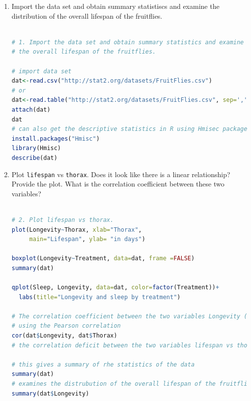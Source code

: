 \documentclass[12pt,letterpaper]{article}
\begin{document}
\begin{enumerate}
	
	\item
	Import the data set and obtain summary statistiscs and examine the distribution of the overall lifespan of the fruitflies.  
	
					\begin{lstlisting}[language=R]

# 1. Import the data set and obtain summary statistics and examine the distrubtion of
# the overall lifespan of the fruitflies.

# import data set
dat<-read.csv("http://stat2.org/datasets/FruitFlies.csv")
# or 
dat<-read.table("http://stat2.org/datasets/FruitFlies.csv", sep=',', header=TRUE)
attach(dat)
dat
# can also get the descriptive statistics in R using Hmisec package
install.packages("Hmisc")
library(Hmisc)
describe(dat)

\end{lstlisting}

\newpage
	\item
	Plot \texttt{lifespan} vs \texttt{thorax}. Does it look like there is a linear relationship? Provide the plot. What is the correlation coefficient between these two variables?
	
						\begin{lstlisting}[language=R]

# 2. Plot lifespan vs thorax. 
plot(Longevity~Thorax, xlab="Thorax",
     main="Lifespan", ylab= "in days")

boxplot(Longevity~Treatment, data=dat, frame =FALSE)
summary(dat)

qplot(Sleep, Longevity, data=dat, color=factor(Treatment))+
  labs(title="Longevity and sleep by treatment")

# The correlation coefficient between the two variables Longevity (or lifespan) and thorax
# using the Pearson correlation
cor(dat$Longevity, dat$Thorax)
# the correlation deficit between the two variables lifespan vs thorax is 0.6364835

# this gives a summary of rhe statistics of the data
summary(dat) 
# examines the distrubution of the overall lifespan of the fruitflies
summary(dat$Longevity)

\end{lstlisting}
	
		\vspace{2cm}
		

\end{enumerate}
\end{document}
